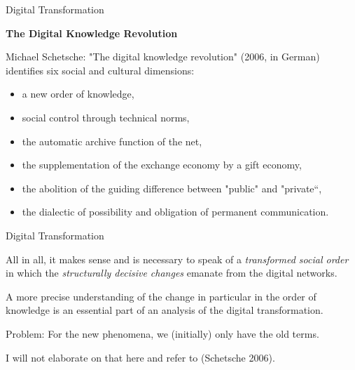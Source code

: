 \documentclass{beamer}
\newcommand{\ueberschrift}[1]{\begin{center}\bf #1\end{center}}
\begin{document}
\begin{frame}{Digital Transformation}
  \ueberschrift{The Digital Knowledge Revolution}

Michael Schetsche: "The digital knowledge revolution" (2006, in German)
identifies six social and cultural dimensions:
\begin{itemize}
\item a new order of knowledge,
\item social control through technical norms,
\item the automatic archive function of the net,
\item the supplementation of the exchange economy by a gift economy,
\item the abolition of the guiding difference between "public" and "private“, 
\item the dialectic of possibility and obligation of permanent communication.
\end{itemize}
\end{frame}
\begin{frame}{Digital Transformation}

All in all, it makes sense and is necessary to speak of a \emph{transformed
  social order} in which the \emph{structurally decisive changes} emanate from
the digital networks.

  A more precise understanding of the change in particular in the order of
  knowledge is an essential part of an analysis of the digital transformation.

  Problem: For the new phenomena, we (initially) only have the old terms.

  I will not elaborate on that here and refer to (Schetsche 2006).

\end{frame}
\end{document}
